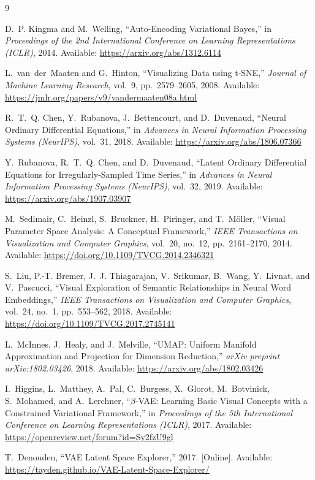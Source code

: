 \documentclass{article}
\begin{document}
\begin{thebibliography}{9}

D.~P. Kingma and M.~Welling,
``Auto-Encoding Variational Bayes,''
in \emph{Proceedings of the 2nd International Conference on Learning
Representations (ICLR)}, 2014.
Available: \url{https://arxiv.org/abs/1312.6114}

L.~van~der~Maaten and G.~Hinton,
``Visualizing Data using t-SNE,''
\emph{Journal of Machine Learning Research}, vol.~9, pp.~2579--2605, 2008.
Available: \url{https://jmlr.org/papers/v9/vandermaaten08a.html}

R.~T.~Q. Chen, Y.~Rubanova, J.~Bettencourt, and D.~Duvenaud,
``Neural Ordinary Differential Equations,''
in \emph{Advances in Neural Information Processing Systems (NeurIPS)}, vol.~31,
2018.
Available: \url{https://arxiv.org/abs/1806.07366}

Y.~Rubanova, R.~T.~Q. Chen, and D.~Duvenaud,
``Latent Ordinary Differential Equations for Irregularly-Sampled Time Series,''
in \emph{Advances in Neural Information Processing Systems (NeurIPS)}, vol.~32,
2019.
Available: \url{https://arxiv.org/abs/1907.03907}

M.~Sedlmair, C.~Heinzl, S.~Bruckner, H.~Piringer, and T.~M{\"o}ller,
``Visual Parameter Space Analysis: A Conceptual Framework,''
\emph{IEEE Transactions on Visualization and Computer Graphics}, vol.~20,
no.~12, pp.~2161--2170, 2014.
Available: \url{https://doi.org/10.1109/TVCG.2014.2346321}

S.~Liu, P.-T. Bremer, J.~J. Thiagarajan, V.~Srikumar, B.~Wang, Y.~Livnat,
and V.~Pascucci,
``Visual Exploration of Semantic Relationships in Neural Word Embeddings,''
\emph{IEEE Transactions on Visualization and Computer Graphics}, vol.~24,
no.~1, pp.~553--562, 2018.
Available: \url{https://doi.org/10.1109/TVCG.2017.2745141}

L.~McInnes, J.~Healy, and J.~Melville,
``UMAP: Uniform Manifold Approximation and Projection for Dimension
Reduction,''
\emph{arXiv preprint arXiv:1802.03426}, 2018.
Available: \url{https://arxiv.org/abs/1802.03426}

I.~Higgins, L.~Matthey, A.~Pal, C.~Burgess, X.~Glorot, M.~Botvinick,
S.~Mohamed, and A.~Lerchner,
``$\beta$-VAE: Learning Basic Visual Concepts with a Constrained Variational
Framework,''
in \emph{Proceedings of the 5th International Conference on Learning
Representations (ICLR)}, 2017.
Available: \url{https://openreview.net/forum?id=Sy2fzU9gl}

T.~Denouden,
``VAE Latent Space Explorer,''
2017. [Online]. Available: \url{https://tayden.github.io/VAE-Latent-Space-Explorer/}

\end{thebibliography}
\end{document}

